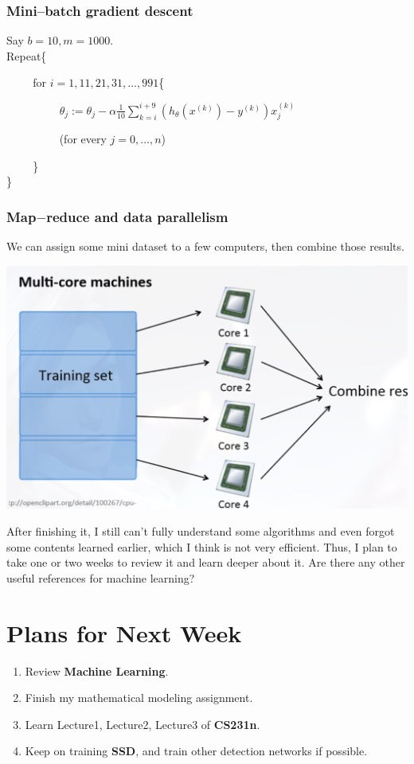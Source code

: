 \documentclass{article}
\begin{document}
\subsubsection{Mini--batch gradient descent}
Say $b = 10, m = 1000$.\\
Repeat\{\par
$\hspace{1cm}$for $i = 1,11,21,31,\ldots,991$\{\par
$\hspace{2cm}$$\theta_j := \theta_j - \alpha\frac{1}{10}\sum\limits_{k=i}^{i+9}(h_{\theta}(x^{(k)}) - y^{(k)})x_j^{(k)}$\par
$\hspace{2cm}$(for every $j=0,\ldots,n$)\par
$\hspace{1cm}$\}\\
\}

\subsubsection{Map$-$reduce and data parallelism}
We can assign some mini dataset to a few computers, then combine those results.
\begin{center}
\includegraphics[scale=0.3]{1.png}
\end{center}
After finishing it, I still can't fully understand some algorithms and even forgot some contents learned earlier, which I think is not very efficient. Thus, I plan to take one or two weeks to review it and learn deeper about it. Are there any other useful references for machine learning?
\section{Plans for Next Week}
\begin{enumerate}
  \item Review \textbf{Machine Learning}.
  \item Finish my mathematical modeling assignment.
  \item Learn Lecture1, Lecture2, Lecture3 of \textbf{CS231n}.
  \item Keep on training \textbf{SSD}, and train other detection networks if possible.
\end{enumerate}
\end{document}

